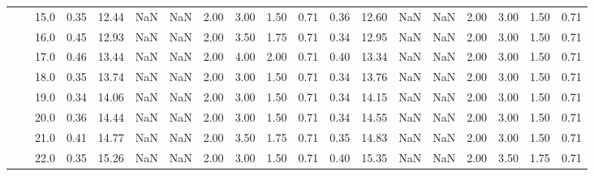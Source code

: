\begin{tabular}{lllrrrrrrrrrrrrrrrr}
       &     & 15.0 &      0.35 &      12.44 &               NaN &                NaN & 2.00 &   3.00 &             1.50 &                         0.71 &      0.36 &      12.60 &               NaN &                NaN & 2.00 &   3.00 &             1.50 &                         0.71 \\
       &     & 16.0 &      0.45 &      12.93 &               NaN &                NaN & 2.00 &   3.50 &             1.75 &                         0.71 &      0.34 &      12.95 &               NaN &                NaN & 2.00 &   3.00 &             1.50 &                         0.71 \\
       &     & 17.0 &      0.46 &      13.44 &               NaN &                NaN & 2.00 &   4.00 &             2.00 &                         0.71 &      0.40 &      13.34 &               NaN &                NaN & 2.00 &   3.00 &             1.50 &                         0.71 \\
       &     & 18.0 &      0.35 &      13.74 &               NaN &                NaN & 2.00 &   3.00 &             1.50 &                         0.71 &      0.34 &      13.76 &               NaN &                NaN & 2.00 &   3.00 &             1.50 &                         0.71 \\
       &     & 19.0 &      0.34 &      14.06 &               NaN &                NaN & 2.00 &   3.00 &             1.50 &                         0.71 &      0.34 &      14.15 &               NaN &                NaN & 2.00 &   3.00 &             1.50 &                         0.71 \\
       &     & 20.0 &      0.36 &      14.44 &               NaN &                NaN & 2.00 &   3.00 &             1.50 &                         0.71 &      0.34 &      14.55 &               NaN &                NaN & 2.00 &   3.00 &             1.50 &                         0.71 \\
       &     & 21.0 &      0.41 &      14.77 &               NaN &                NaN & 2.00 &   3.50 &             1.75 &                         0.71 &      0.35 &      14.83 &               NaN &                NaN & 2.00 &   3.00 &             1.50 &                         0.71 \\
       &     & 22.0 &      0.35 &      15.26 &               NaN &                NaN & 2.00 &   3.00 &             1.50 &                         0.71 &      0.40 &      15.35 &               NaN &                NaN & 2.00 &   3.50 &             1.75 &                         0.71 \\

\end{tabular}
